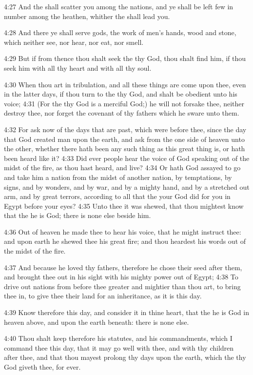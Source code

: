 4:27 And the \LORD shall scatter you among the nations, and ye shall be left few in number among the heathen, whither the \LORD shall lead you.

4:28 And there ye shall serve gods, the work of men's hands, wood and stone, which neither see, nor hear, nor eat, nor smell.

4:29 But if from thence thou shalt seek the \LORD thy God, thou shalt find him, if thou seek him with all thy heart and with all thy soul.

4:30 When thou art in tribulation, and all these things are come upon thee, even in the latter days, if thou turn to the \LORD thy God, and shalt be obedient unto his voice; 4:31 (For the \LORD thy God is a merciful God;) he will not forsake thee, neither destroy thee, nor forget the covenant of thy fathers which he sware unto them.

4:32 For ask now of the days that are past, which were before thee, since the day that God created man upon the earth, and ask from the one side of heaven unto the other, whether there hath been any such thing as this great thing is, or hath been heard like it?  4:33 Did ever people hear the voice of God speaking out of the midst of the fire, as thou hast heard, and live?  4:34 Or hath God assayed to go and take him a nation from the midst of another nation, by temptations, by signs, and by wonders, and by war, and by a mighty hand, and by a stretched out arm, and by great terrors, according to all that the \LORD your God did for you in Egypt before your eyes?  4:35 Unto thee it was shewed, that thou mightest know that the \LORD he is God; there is none else beside him.

4:36 Out of heaven he made thee to hear his voice, that he might instruct thee: and upon earth he shewed thee his great fire; and thou heardest his words out of the midst of the fire.

4:37 And because he loved thy fathers, therefore he chose their seed after them, and brought thee out in his sight with his mighty power out of Egypt; 4:38 To drive out nations from before thee greater and mightier than thou art, to bring thee in, to give thee their land for an inheritance, as it is this day.

4:39 Know therefore this day, and consider it in thine heart, that the \LORD he is God in heaven above, and upon the earth beneath: there is none else.

4:40 Thou shalt keep therefore his statutes, and his commandments, which I command thee this day, that it may go well with thee, and with thy children after thee, and that thou mayest prolong thy days upon the earth, which the \LORD thy God giveth thee, for ever.

